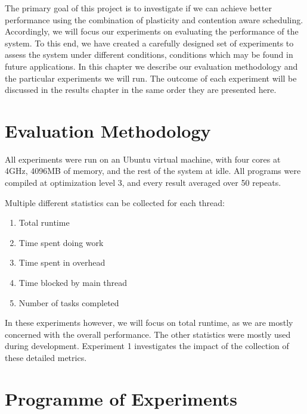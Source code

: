 
\newif\iflabela
\newif\iflabelb
\newif\iflabelc
\newif\iflabeld
\newif\iflabele



The primary goal of this project is to investigate if we can achieve better performance using the combination of plasticity and contention aware scheduling. Accordingly, we will focus our experiments on evaluating the performance of the system. To this end, we have created a carefully designed set of experiments to assess the system under different conditions, conditions which may be found in future applications. In this chapter we describe our evaluation methodology and the particular experiments we will run. The outcome of each experiment will be discussed in the results chapter in the same order they are presented here.



\section{Evaluation Methodology}

All experiments were run on an Ubuntu virtual machine, with four cores at 4GHz, 4096MB of memory, and the rest of the system at idle. All programs were compiled at optimization level 3, and every result averaged over 50 repeats.

Multiple different statistics can be collected for each thread:

\begin{enumerate}
	\item Total runtime
	\item Time spent doing work
	\item Time spent in overhead
	\item Time blocked by main thread
	\item Number of tasks completed
\end{enumerate}

In these experiments however, we will focus on total runtime, as we are mostly concerned with the overall performance. The other statistics were mostly used during development. Experiment 1 investigates the impact of the collection of these detailed metrics.



\section{Programme of Experiments}

